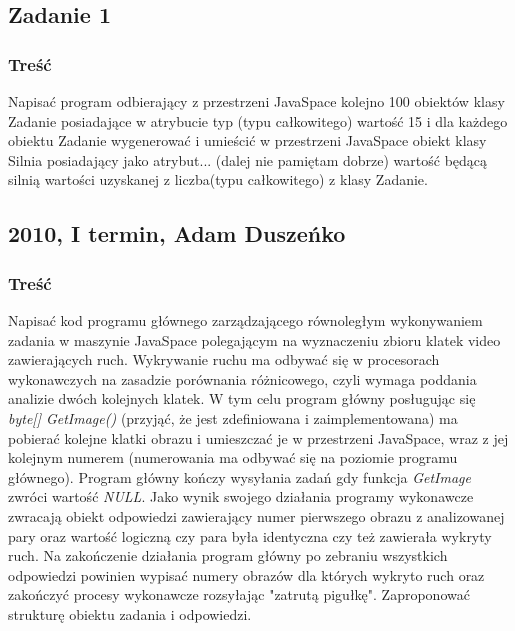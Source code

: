 	\subsection{Zadanie 1}
		\subsubsection{Treść}
			Napisać program odbierający z przestrzeni JavaSpace kolejno 100 obiektów klasy Zadanie posiadające w atrybucie typ (typu całkowitego) wartość 15 i dla każdego obiektu Zadanie wygenerować i umieścić w przestrzeni JavaSpace obiekt klasy Silnia posiadający jako atrybut... (dalej nie pamiętam dobrze) wartość będącą silnią wartości uzyskanej z liczba(typu całkowitego) z klasy Zadanie.
	
	\newpage
	\subsection{2010, I termin, Adam Duszeńko}
		\subsubsection{Treść}
			Napisać kod programu głównego zarządzającego równoległym wykonywaniem zadania w maszynie JavaSpace polegającym na wyznaczeniu zbioru klatek video zawierających ruch. Wykrywanie ruchu ma odbywać się w procesorach wykonawczych na zasadzie porównania różnicowego, czyli wymaga poddania analizie dwóch kolejnych klatek. W tym celu program główny posługując się \textit{byte[] GetImage()} (przyjąć, że jest zdefiniowana i zaimplementowana) ma pobierać kolejne klatki obrazu i umieszczać je w przestrzeni JavaSpace, wraz z jej kolejnym numerem (numerowania ma odbywać się na poziomie programu głównego). Program główny kończy wysyłania zadań gdy funkcja \textit{GetImage} zwróci wartość \textit{NULL}. Jako wynik swojego działania programy wykonawcze zwracają obiekt odpowiedzi zawierający numer pierwszego obrazu z analizowanej pary oraz wartość logiczną czy para była identyczna czy też zawierała wykryty ruch. Na zakończenie działania program główny po zebraniu wszystkich odpowiedzi powinien wypisać numery obrazów dla których wykryto ruch oraz zakończyć procesy wykonawcze rozsyłając "zatrutą pigułkę". Zaproponować strukturę obiektu zadania i odpowiedzi.
